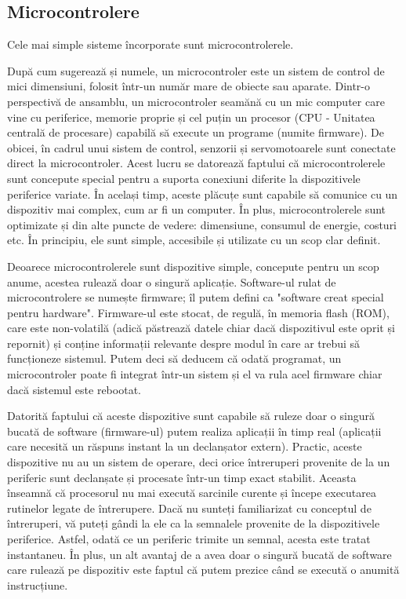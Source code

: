 \subsection{Microcontrolere}
\label{sec:embed-ics-micro}

Cele mai simple sisteme încorporate sunt microcontrolerele.


După cum sugerează și numele, un microcontroler este un sistem de control de
mici dimensiuni, folosit într-un număr mare de obiecte sau aparate. Dintr-o
perspectivă de ansamblu, un microcontroler seamănă cu un mic computer care vine
cu periferice, memorie proprie și cel puțin un procesor (CPU - Unitatea centrală
de procesare) capabilă să execute un programe (numite firmware). De obicei, în
cadrul unui sistem de control, senzorii și servomotoarele sunt conectate direct
la microcontroler. Acest lucru se datorează faptului că microcontrolerele sunt
concepute special pentru a suporta conexiuni diferite la dispozitivele
periferice variate. În același timp, aceste plăcuțe sunt capabile să comunice cu
un dispozitiv mai complex, cum ar fi un computer. În plus, microcontrolerele
sunt optimizate și din alte puncte de vedere: dimensiune, consumul de energie,
costuri etc. În principiu, ele sunt simple, accesibile și utilizate cu un scop
clar definit.

Deoarece microcontrolerele sunt dispozitive simple, concepute pentru un scop
anume, acestea rulează doar o singură aplicație. Software-ul rulat de
microcontrolere se numește firmware; îl putem defini ca "software creat special
pentru hardware". Firmware-ul este stocat, de regulă, în memoria flash (ROM),
care este non-volatilă (adică păstrează datele chiar dacă dispozitivul este
oprit și repornit) și conține informații relevante despre modul în care ar
trebui să funcționeze sistemul. Putem deci să deducem că odată programat, un
microcontroler poate fi integrat într-un sistem și el va rula acel firmware
chiar dacă sistemul este rebootat.

Datorită faptului că aceste dispozitive sunt capabile să ruleze doar o singură
bucată de software (firmware-ul) putem realiza aplicații în timp real (aplicații
care necesită un răspuns instant la un declanșator extern). Practic, aceste
dispozitive nu au un sistem de operare, deci orice întreruperi provenite de la
un periferic sunt declanșate și procesate într-un timp exact stabilit. Aceasta
înseamnă că procesorul nu mai execută sarcinile curente și începe executarea
rutinelor legate de întrerupere. Dacă nu sunteți familiarizat cu conceptul de
întreruperi, vă puteți gândi la ele ca la semnalele provenite de la
dispozitivele periferice. Astfel, odată ce un periferic trimite un semnal,
acesta este tratat instantaneu. În plus, un alt avantaj de a avea doar o singură
bucată de software care rulează pe dispozitiv este faptul că putem prezice când
se execută o anumită instrucțiune.

